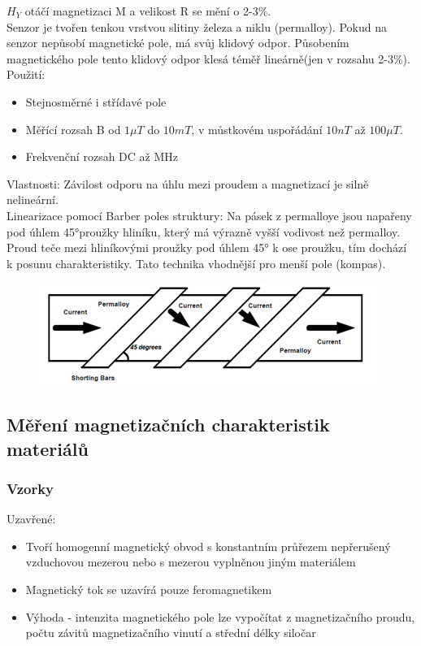 \(H_Y\) otáčí magnetizaci M a velikost R se mění o 2-3\%.\\
Senzor je tvořen tenkou vrstvou slitiny železa a niklu (permalloy). Pokud na senzor nepůsobí magnetické pole, má svůj klidový odpor. Působením magnetického pole tento klidový odpor klesá téměř lineárně(jen v rozsahu 2-3\%).\\
Použití:
\begin{itemize}
    \item Stejnosměrné i střídavé pole
    \item Měřící rozsah B od \(1\mu T\) do \(10mT\), v můstkovém uspořádání \(10nT\) až \(100\mu T\).
    \item Frekvenční rozsah DC až MHz
\end{itemize}
Vlastnosti: Závilost odporu na úhlu mezi proudem a magnetizací je silně nelineární.\\
Linearizace pomocí Barber poles struktury: Na pásek z permalloye jsou napařeny pod úhlem 45°proužky hliníku, který má výrazně vyšší vodivost než permalloy. Proud teče mezi hliníkovými proužky pod úhlem 45° k ose proužku, tím dochází k posunu charakteristiky. Tato technika vhodnější pro menší pole (kompas). \\
\begin{figure}[h!]
    \centering
    \includegraphics[scale = 0.7]{images/AMRLin.png}
\end{figure}

\subsection{Měření magnetizačních charakteristik materiálů}
\subsubsection{Vzorky}
Uzavřené:
\begin{itemize}
    \item Tvoří homogenní magnetický obvod s konstantním průřezem nepřerušený vzduchovou mezerou nebo s mezerou vyplněnou jiným materiálem
    \item Magnetický tok se uzavírá pouze feromagnetikem
    \item Výhoda - intenzita magnetického pole lze vypočítat z magnetizačního proudu, počtu závitů magnetizačního vinutí a střední délky siločar
\end{itemize}

